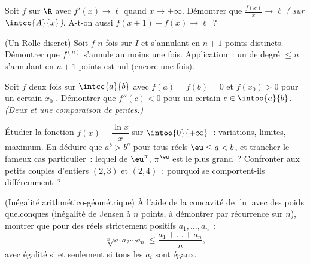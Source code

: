 \begin{exercise}[$\star\star$]\label{exo:b1:derivative:5}
Soit $f$  sur $\R$ avec $f' (x)\to \ell$ quand $x \to
+\infty$. Démontrer que $\frac{f(x)}{x} \to \ell$ \emph{( sur $\intcc{A}{x}$)}. A-t-on aussi $f(x+1) - f(x) \to \ell$~?
\end{exercise}

\begin{exercise}[$\star\star$]\label{exo:b1:derivative:6}
(Un Rolle discret) Soit $f$ $n$ fois  sur $I$ et
s'annulant en $n + 1$ points distincts. Démontrer que $f^{(n)}$ s'annule au
moins une fois. Application~: un  de degré $\leq n$ s'annulant en
$n+1$ points est nul (encore une fois).
\end{exercise}

\begin{exercise}[$\star\star$]\label{exo:b1:derivative:7}
Soit $f$ deux fois  sur $\intcc{a}{b}$ avec $f(a) = f(b)
= 0$ et $f(x_0) > 0$ pour un certain $x_0$ . Démontrer que $f''(c) <
0$ pour un certain $c \in \intoo{a}{b}$. \emph{(Deux  et une comparaison de pentes.)}
\end{exercise}

\begin{exercise}[$\star\star$]\label{exo:b1:derivative:8}
Étudier la fonction $f(x) = \dfrac{\ln x}{x}$ sur
$\intoo{0}{+\infty}$~: variations, limites, maximum. En déduire que $a^b
> b^a$ pour tous réels $\eu \leq a < b$, et trancher le fameux cas
particulier~: lequel de $\eu^\pi$, $\pi^\eu$ est le plus grand~?
Confronter aux petits couples d'entiers $(2,3)$ et $(2,4)$~: pourquoi se
comportent-ils différemment~?
\end{exercise}

\begin{exercise}[$\star\star$]\label{exo:b1:derivative:9}
(Inégalité arithmético-géométrique) À l'aide de la concavité de $\ln$ avec
des poids quelconques (inégalité de Jensen à $n$ points, à démontrer par
récurrence sur $n$), montrer que pour des réels strictement positifs $a_1, \dots, a_n$~:
\[
\sqrt[n]{a_1 a_2 \cdots a_n} \leq \frac{a_1 + \dots + a_n}{n},
\]
avec égalité si et seulement si tous les $a_i$ sont égaux.
\end{exercise}

